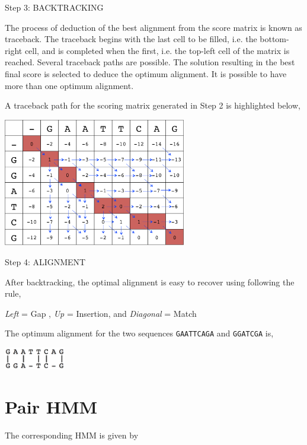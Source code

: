 \documentclass[english, a4paper,11pt]{article}
\begin{document}
\pagebreak

Step 3: BACKTRACKING

 The process of deduction of the best alignment from the score matrix is known as traceback. The traceback begins with the last cell to be filled, i.e. the bottom-right cell, and is completed when the first, i.e. the top-left cell of the matrix is reached. Several traceback paths are possible. The solution resulting in the best final score is selected to deduce the optimum alignment. It is possible to have more than one optimum alignment. 

A traceback path for the scoring matrix generated in Step 2 is highlighted below, 

\begin{center}
\includegraphics[width=0.6\textwidth]{backtracking.png}
\end{center}

Step 4: ALIGNMENT

After backtracking, the optimal alignment is easy to recover using following the rule,

 \emph{Left} = Gap , \emph{Up} = Insertion, and \emph{Diagonal} = Match 

The optimum alignment for the two sequences \texttt{GAATTCAGA} and \texttt{GGATCGA} is,

\begin{center}
\includegraphics[width=0.2\textwidth]{alignment.png}
\end{center}

\section{Pair HMM}

The corresponding HMM is given by
\end{document}
